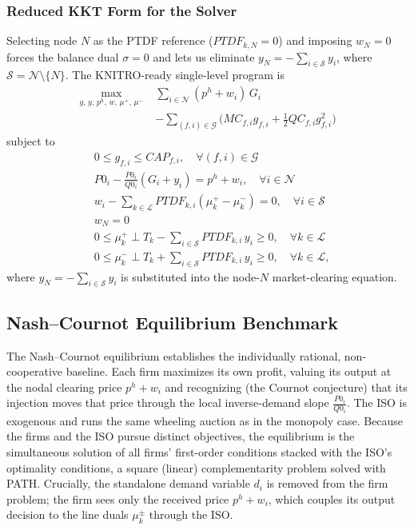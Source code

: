 \documentclass[lettersize,journal]{IEEEtran}
\begin{document}
\subsubsection{Reduced KKT Form for the Solver}

Selecting node $N$ as the PTDF reference ($PTDF_{k,N} = 0$) and imposing
$w_N = 0$ forces the balance dual $\sigma = 0$ and lets us eliminate
$y_N = -\sum_{i \in \mathcal{S}} y_i$, where
$\mathcal{S} = \mathcal{N} \setminus \{N\}$. The KNITRO-ready single-level
program is
\begin{equation}
\begin{split}
\max_{g,\,y,\,p^h,\,w,\,\mu^{+},\,\mu^{-}} \;&
 \sum_{i \in \mathcal{N}} (p^h + w_i)\, G_i \\
& - \sum_{(f,i) \in \mathcal{G}}
   \big( MC_{f,i} g_{f,i} + \tfrac{1}{2} QC_{f,i} g_{f,i}^2 \big)
\end{split}
\end{equation}
subject to
\begin{align}
& 0 \le g_{f,i} \le CAP_{f,i}, \quad \forall (f,i) \in \mathcal{G} \\
& P0_i - \frac{P0_i}{Q0_i}\left( G_i + y_i \right) = p^h + w_i,
   \quad \forall i \in \mathcal{N} \\
& w_i - \sum_{k \in \mathcal{L}} PTDF_{k,i}(\mu_k^{+} - \mu_k^{-}) = 0,
   \quad \forall i \in \mathcal{S} \\
& w_N = 0 \\
& 0 \le \mu_k^{+} \perp T_k - \sum_{i \in \mathcal{S}} PTDF_{k,i}\, y_i \ge 0,
   \quad \forall k \in \mathcal{L} \\
& 0 \le \mu_k^{-} \perp T_k + \sum_{i \in \mathcal{S}} PTDF_{k,i}\, y_i \ge 0,
   \quad \forall k \in \mathcal{L},
\end{align}
where $y_N = -\sum_{i \in \mathcal{S}} y_i$ is substituted into the node-$N$
market-clearing equation.

\subsection{Nash--Cournot Equilibrium Benchmark}

The Nash--Cournot equilibrium establishes the individually rational,
non-cooperative baseline. Each firm maximizes its own profit, valuing its
output at the nodal clearing price $p^h + w_i$ and recognizing (the Cournot
conjecture) that its injection moves that price through the local
inverse-demand slope $\tfrac{P0_i}{Q0_i}$. The ISO is exogenous and runs the
same wheeling auction as in the monopoly case. Because the firms and the
ISO pursue distinct objectives, the equilibrium is the simultaneous
solution of all firms' first-order conditions stacked with the ISO's
optimality conditions, a square (linear) complementarity problem solved
with PATH. Crucially, the standalone demand variable $d_i$ is removed from
the firm problem; the firm sees only the received price $p^h + w_i$, which
couples its output decision to the line duals $\mu_k^{\pm}$ through the ISO.
\end{document}
